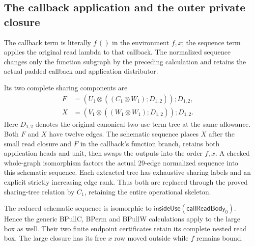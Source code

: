 \subsection{The callback application and the outer private closure}
The callback term is literally $f\,()$ in the environment $f,x$; the
sequence term applies the original read lambda to that callback. The
normalized sequence changes only the function subgraph by the preceding
calculation and retains the actual padded callback and application distributor.

Its two complete sharing components are
\[
\begin{aligned}
 F&=(U_1\otimes((C_1\otimes W_1);D_{1,2}));D_{1,2},\\
 X&=(V_1\otimes((W_1\otimes W_1);D_{1,2}));D_{1,2}.
\end{aligned}
\]
Here $D_{1,2}$ denotes the original canonical two-use term tree at the
same allowance. Both $F$ and $X$ have twelve edges. The schematic sequence
places $X$ after the small read closure and $F$ in the callback's function
branch, retains both application heads and unit, then swaps the outputs
into the order $f,x$. A checked whole-graph isomorphism factors the actual
29-edge normalized sequence into this schematic sequence. Each extracted
tree has exhaustive sharing labels and an explicit strictly increasing
edge rank. Thus both are replaced through the proved sharing-tree relation
by $C_1$, retaining the entire operational skeleton.

The reduced schematic sequence is isomorphic to
$\mathsf{insideUse}(\mathsf{callReadBody}_0)$. Hence the generic BPullC,
BPerm and BPullW calculations apply to the large box as well. Their two
finite endpoint certificates retain its complete nested read box. The
large closure has its free $x$ row moved outside while $f$ remains bound.

